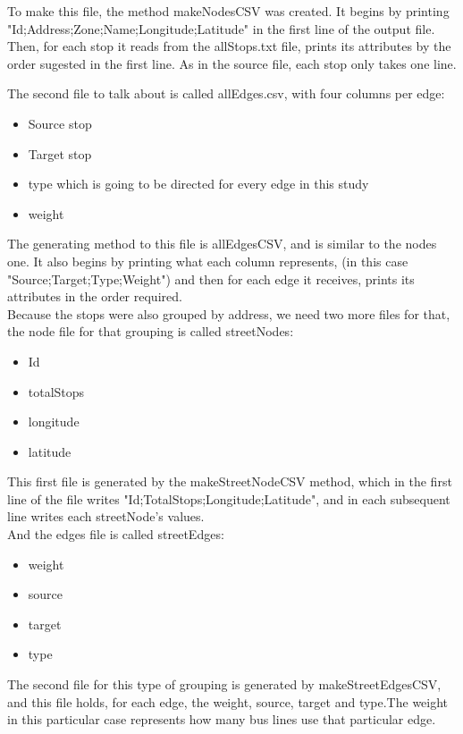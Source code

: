 \documentclass[12pt]{article}
\begin{document}
\begin{multicols}{2}
	To make this file, the method makeNodesCSV was created.
	It begins by printing "Id;Address;Zone;Name;Longitude;Latitude" in the first line of the output file. Then, for each stop it reads from the allStops.txt file, prints its attributes by the order sugested in the first line. As in the source file, each stop only takes one line.
	
	The second file to talk about is called allEdges.csv, with four columns per edge:
	
	\begin{itemize}
		\item Source stop
		\item Target stop
		\item type which is going to be directed for every edge in this study
		\item weight 
	\end{itemize}
	
	The generating method to this file is allEdgesCSV, and is similar to the nodes one.
	It also begins by printing what each column represents, (in this case "Source;Target;Type;Weight") and then for each edge it receives, prints its attributes in the order required.\\
    Because the stops were also grouped by address, we need two more files for that, the node file for that grouping is called streetNodes:\\
    \begin{itemize}
    \item Id
    \item totalStops
    \item longitude
    \item latitude
    \end{itemize}
    
    This first file is generated by the makeStreetNodeCSV method, which in the first line of the file writes "Id;TotalStops;Longitude;Latitude", and in each subsequent line writes each streetNode's values. \\
   And the edges file is called streetEdges:\\
   \begin{itemize}
   \item weight
   \item source 
   \item target 
   \item type
   \end{itemize}
    The second file for this type of grouping  is generated by makeStreetEdgesCSV, and this file holds, for each edge, the weight, source, target and type.The weight in this particular case represents how many bus lines use that particular edge.\\
    

\end{multicols}
\end{document}
